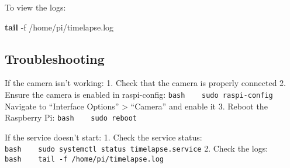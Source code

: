 \documentclass[
]{article}
\newenvironment{Shaded}{\begin{snugshade}}{\end{snugshade}}
\newcommand{\AttributeTok}[1]{\textcolor[rgb]{0.13,0.29,0.53}{#1}}
\newcommand{\FunctionTok}[1]{\textcolor[rgb]{0.13,0.29,0.53}{\textbf{#1}}}
\newcommand{\NormalTok}[1]{#1}
\begin{document}
To view the logs:

\begin{Shaded}
\begin{Highlighting}[]
\FunctionTok{tail} \AttributeTok{{-}f}\NormalTok{ /home/pi/timelapse.log}
\end{Highlighting}
\end{Shaded}

\subsection{Troubleshooting}\label{troubleshooting}

If the camera isn't working: 1. Check that the camera is properly
connected 2. Ensure the camera is enabled in raspi-config:
\texttt{bash\ \ \ \ sudo\ raspi-config} Navigate to ``Interface
Options'' \textgreater{} ``Camera'' and enable it 3. Reboot the
Raspberry Pi: \texttt{bash\ \ \ \ sudo\ reboot}

If the service doesn't start: 1. Check the service status:
\texttt{bash\ \ \ \ sudo\ systemctl\ status\ timelapse.service} 2. Check
the logs: \texttt{bash\ \ \ \ tail\ -f\ /home/pi/timelapse.log}
\end{document}
